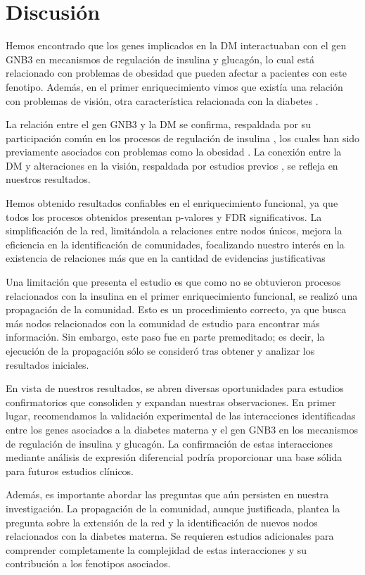 \section{Discusión}
Hemos encontrado que los genes implicados en la DM interactuaban con el gen GNB3 en mecanismos de regulación de insulina y glucagón, lo cual está relacionado con problemas de obesidad que pueden afectar a pacientes con este fenotipo. Además, en el primer enriquecimiento vimos que existía una relación con problemas de visión, otra característica relacionada con la diabetes \cite{Bailes2002}.

La relación entre el gen GNB3 y la DM se confirma, respaldada por su participación común en los procesos de regulación de insulina \cite{Rodolaki2023, Feng2019}, los cuales han sido previamente asociados con problemas como la obesidad \cite{Shah2011}. La conexión entre la DM y alteraciones en la visión, respaldada por estudios previos \cite{Nelson1986}, se refleja en nuestros resultados.

Hemos obtenido resultados confiables en el enriquecimiento funcional, ya que todos los procesos obtenidos presentan p-valores y FDR significativos.
La simplificación de la red, limitándola a relaciones entre nodos únicos, mejora la eficiencia en la identificación de comunidades, focalizando nuestro interés en la existencia de relaciones más que en la cantidad de evidencias justificativas

Una limitación que presenta el estudio es que como no se obtuvieron procesos relacionados con la insulina en el primer enriquecimiento funcional, se realizó una propagación de la comunidad. Esto es un procedimiento correcto, ya que busca más nodos relacionados con la comunidad de estudio para encontrar más información. Sin embargo, este paso fue en parte premeditado; es decir, la ejecución de la propagación sólo se consideró tras obtener y analizar los resultados iniciales.

En vista de nuestros resultados, se abren diversas oportunidades para estudios confirmatorios que consoliden y expandan nuestras observaciones. En primer lugar, recomendamos la validación experimental de las interacciones identificadas entre los genes asociados a la diabetes materna y el gen GNB3 en los mecanismos de regulación de insulina y glucagón. La confirmación de estas interacciones mediante análisis de expresión diferencial \cite{Haynes2013} podría proporcionar una base sólida para futuros estudios clínicos.

Además, es importante abordar las preguntas que aún persisten en nuestra investigación. La propagación de la comunidad, aunque justificada, plantea la pregunta sobre la extensión de la red y la identificación de nuevos nodos relacionados con la diabetes materna. Se requieren estudios adicionales para comprender completamente la complejidad de estas interacciones y su contribución a los fenotipos asociados.

